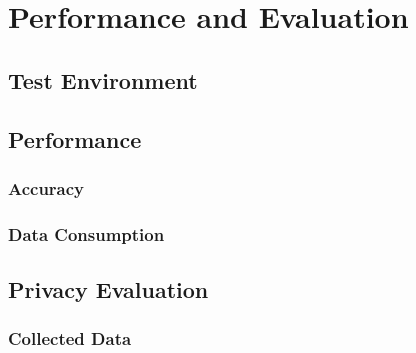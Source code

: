 
\chapter{Performance and Evaluation}\label{chapter:evaluation}
\section{Test Environment}
\section{Performance}
\subsection{Accuracy}
\subsection{Data Consumption}
\section{Privacy Evaluation}
\subsection{Collected Data}
